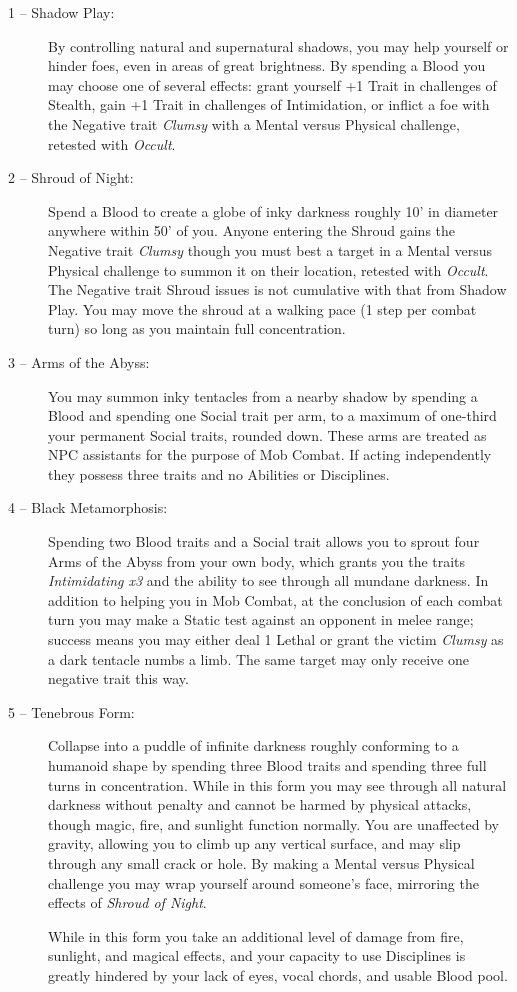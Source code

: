 \begin{description}
	\item[1 -- Shadow Play:]  By controlling natural and supernatural shadows, you may help yourself or 
	hinder foes, even in areas of great brightness.  By spending a Blood you may choose one of several 
	effects:  grant yourself +1 Trait in challenges of Stealth, gain +1 Trait in challenges of 
	Intimidation, or inflict a foe with the Negative trait \emph{Clumsy} with a Mental versus Physical 
	challenge, retested with \emph{Occult}.
	\item[2 -- Shroud of Night:]  Spend a Blood to create a globe of inky darkness roughly 10' in diameter 
	anywhere within 50' of you.  Anyone entering the Shroud gains the Negative trait \emph{Clumsy} though 
	you must best a target in a Mental versus Physical challenge to summon it on their location, retested 
	with \emph{Occult}.  The Negative trait Shroud issues is not cumulative with that from Shadow Play.  
	You may move the shroud at a walking pace (1 step per combat turn) so long as you maintain full 
	concentration.
	\item[3 -- Arms of the Abyss:]  You may summon inky tentacles from a nearby shadow by spending a Blood 
	and spending one Social trait per arm, to a maximum of one-third your permanent Social traits, rounded 
	down.  These arms are treated as NPC assistants for the purpose of Mob Combat.  If acting independently 
	they possess three traits and no Abilities or Disciplines.
	\item[4 -- Black Metamorphosis:]  Spending two Blood traits and a Social trait allows you to sprout four 
	Arms of the Abyss from your own body, which grants you the traits \emph{Intimidating x3} and the ability to 
	see through all mundane darkness.  In addition to helping you in Mob Combat, at the conclusion of each 
	combat turn you may make a Static test against an opponent in melee range; success means you may either 
	deal 1 Lethal or grant the victim \emph{Clumsy} as a dark tentacle numbs a limb.  The same target may only 
	receive one negative trait this way.
	\item[5 -- Tenebrous Form:]  Collapse into a puddle of infinite darkness roughly conforming to a humanoid 
	shape by spending three Blood traits and spending three full turns in concentration.  While in this form 
	you may see through all natural darkness without penalty and cannot be harmed by physical attacks, though 
	magic, fire, and sunlight function normally.  You are unaffected by gravity, allowing you to climb up any 
	vertical surface, and may slip through any small crack or hole.  By making a Mental versus Physical 
	challenge you may wrap yourself around someone's face, mirroring the effects of \emph{Shroud of Night}.
	
	While in this form you take an additional level of damage from fire, sunlight, and magical effects, and your 
	capacity to use Disciplines is greatly hindered by your lack of eyes, vocal chords, and usable Blood pool.
\end{description}


